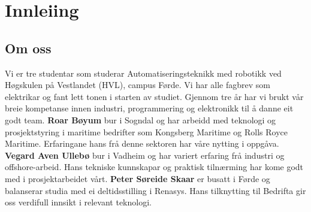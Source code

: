 \chapter{Innleiing}
\thispagestyle{fancy}

\section{Om oss}
Vi er tre studentar som studerar Automatiseringsteknikk med robotikk ved Høgskulen på Vestlandet (\gls{HVL}), campus Førde.
Vi har alle fagbrev som elektrikar og fant lett tonen i starten av studiet.
Gjennom tre år har vi brukt vår breie kompetanse innen industri, programmering og elektronikk
til å danne eit godt team.
\newline \newline
\textbf{Roar Bøyum} bur i Sogndal og har arbeidd med teknologi og prosjektstyring i maritime bedrifter som
Kongsberg Maritime og Rolls Royce Maritime. Erfaringane hans frå denne sektoren har våre nytting i oppgåva.
\newline \newline
\textbf{Vegard Aven Ullebø} bur i Vadheim og har variert erfaring frå industri og offshore-arbeid. 
Hans tekniske kunnskapar og praktisk tilnærming har kome godt med i prosjektarbeidet vårt. 
\newline \newline
\textbf{Peter Søreide Skaar} er busatt i Førde og balanserar studia med ei deltidsstilling i Renasys. Hans tilknytting til Bedrifta
gir oss verdifull innsikt i relevant teknologi. 

\newpage


